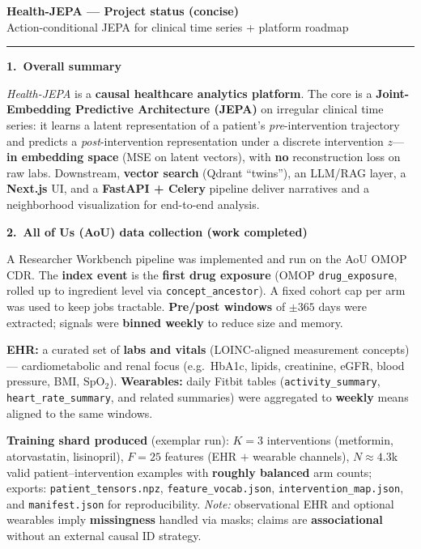 \documentclass[10pt,a4paper]{article}
\newcommand{\sectiontitle}[1]{%
  \vspace{0.55em}\noindent\textbf{#1}\par\vspace{0.35em}}
\begin{document}
\thispagestyle{empty}
{\centering\large\textbf{Health-JEPA --- Project status (concise)}\\[0.35em]
\small Action-conditional JEPA for clinical time series + platform roadmap\par}
\vspace{0.55em}
\rule{\linewidth}{0.4pt}
\vspace{0.45em}

\sectiontitle{1.\ Overall summary}
\emph{Health-JEPA} is a \textbf{causal healthcare analytics platform}. The core is a
\textbf{Joint-Embedding Predictive Architecture (JEPA)} on irregular clinical time series:
it learns a latent representation of a patient's \emph{pre}-intervention trajectory and
predicts a \emph{post}-intervention representation under a discrete intervention $z$---%
\textbf{in embedding space} (MSE on latent vectors), with \textbf{no} reconstruction loss on raw labs.
Downstream, \textbf{vector search} (Qdrant ``twins''), an LLM/RAG layer, a \textbf{Next.js} UI,
and a \textbf{FastAPI + Celery} pipeline deliver narratives and a neighborhood visualization
for end-to-end analysis.

\sectiontitle{2.\ All of Us (AoU) data collection (work completed)}
A Researcher Workbench pipeline was implemented and run on the AoU OMOP CDR. The
\textbf{index event} is the \textbf{first drug exposure} (OMOP \texttt{drug\_exposure},
rolled up to ingredient level via \texttt{concept\_ancestor}). A fixed cohort cap per arm
was used to keep jobs tractable. \textbf{Pre/post windows} of $\pm 365$ days were extracted;
signals were \textbf{binned weekly} to reduce size and memory.

\textbf{EHR:} a curated set of \textbf{labs and vitals} (LOINC-aligned measurement concepts)---%
cardiometabolic and renal focus (e.g.\ HbA1c, lipids, creatinine, eGFR, blood pressure, BMI, SpO$_2$).
\textbf{Wearables:} daily Fitbit tables (\texttt{activity\_summary}, \texttt{heart\_rate\_summary},
and related summaries) were aggregated to \textbf{weekly} means aligned to the same windows.

\textbf{Training shard produced} (exemplar run): $K{=}3$ interventions
(metformin, atorvastatin, lisinopril), $F{=}25$ features (EHR $+$ wearable channels),
$N\approx 4.3$k valid patient--intervention examples with \textbf{roughly balanced} arm counts;
exports: \texttt{patient\_tensors.npz}, \texttt{feature\_vocab.json},
\texttt{intervention\_map.json}, and \texttt{manifest.json} for reproducibility.
\textit{Note:} observational EHR and optional wearables imply \textbf{missingness} handled via masks;%
claims are \textbf{associational} without an external causal ID strategy.
\end{document}
